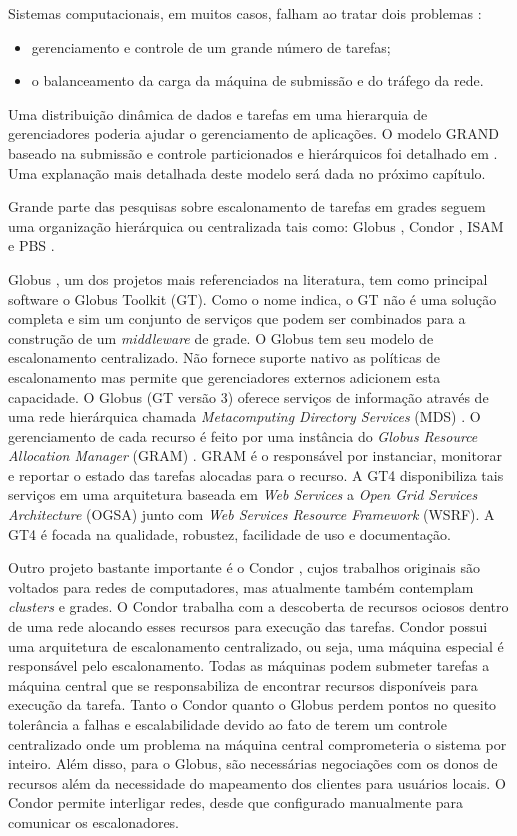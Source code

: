 Sistemas computacionais, em muitos casos, falham ao tratar dois problemas \cite{Mangan2006}: 

\begin{itemize}
	\item gerenciamento e controle de um grande número de tarefas; 
	\item o balanceamento da carga da máquina de submissão e do tráfego da rede.
\end{itemize}

Uma distribuição dinâmica de dados e tarefas em uma hierarquia de gerenciadores poderia ajudar o gerenciamento de aplicações. O modelo GRAND baseado na submissão e controle particionados e hierárquicos foi detalhado em \cite{Mangan2006}. Uma explanação mais detalhada deste modelo será dada no próximo capítulo.

Grande parte das pesquisas sobre escalonamento de tarefas em grades seguem uma organização hierárquica ou centralizada tais como: Globus \cite{Foster1998}, Condor \cite{condor2007}, ISAM \cite{isam} e PBS \cite{Bayucan1998}.

Globus \cite{Globus}, um dos projetos mais referenciados na literatura, tem como principal software o Globus Toolkit (GT). Como o nome indica, o GT não é uma solução completa e sim um conjunto de serviços que podem ser combinados para a construção de um \emph{middleware} de grade. O Globus \cite{Foster1998} tem seu modelo de escalonamento centralizado. Não fornece suporte nativo as políticas de escalonamento mas permite que gerenciadores externos adicionem esta capacidade. O Globus (GT versão 3) oferece serviços de informação através de uma rede hierárquica chamada \emph{Metacomputing Directory Services} (MDS) \cite{Santos}. O gerenciamento de cada recurso é feito por uma instância do {\it Globus Resource Allocation Manager} (GRAM) \cite{Andrade2002}. GRAM é o responsável por instanciar, monitorar e reportar o estado das tarefas alocadas para o recurso. A GT4 \cite{Leon2006} disponibiliza tais serviços em uma arquitetura baseada em {\it Web Services} a {\it Open Grid Services Architecture} (OGSA) junto com {\it Web Services Resource Framework} (WSRF). A GT4 é focada na qualidade, robustez, facilidade de uso e documentação.

Outro projeto bastante importante é o Condor \cite{condor2007}, cujos trabalhos originais são voltados para redes de computadores, mas atualmente também contemplam {\it clusters} e grades. O Condor trabalha com a descoberta de recursos ociosos dentro de uma rede alocando esses recursos para execução das tarefas. Condor possui uma arquitetura de escalonamento centralizado, ou seja, uma máquina especial é responsável pelo escalonamento. Todas as máquinas podem submeter tarefas a máquina central que se responsabiliza de encontrar recursos disponíveis para execução da tarefa. Tanto o Condor quanto o Globus perdem pontos no quesito tolerância a falhas e escalabilidade devido ao fato de terem um controle centralizado onde um problema na máquina central comprometeria o sistema por inteiro. Além disso, para o Globus, são necessárias negociações com os donos de recursos além da necessidade do mapeamento dos clientes para usuários locais. O Condor permite interligar redes, desde que configurado manualmente para comunicar os escalonadores.

